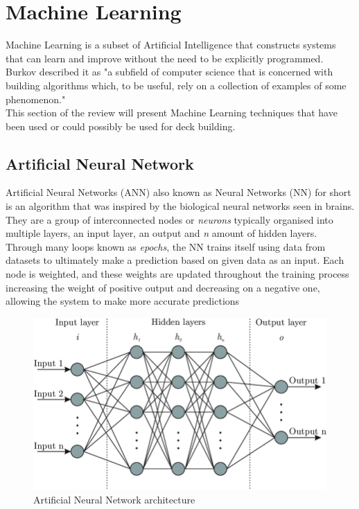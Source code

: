 \documentclass{report} %
\begin{document}
\section{Machine Learning}
Machine Learning is a subset of Artificial Intelligence that constructs systems that can learn and improve without the need to be explicitly programmed. Burkov described it as "a subﬁeld of computer science that is concerned with building algorithms which, to be useful, rely on a collection of examples of some phenomenon." \cite{burkov2019} \\
\indent This section of the review will present Machine Learning techniques that have been used or could possibly be used for deck building.
\subsection{Artificial Neural Network}
Artificial Neural Networks (ANN) also known as Neural Networks (NN) for short is an algorithm that was inspired by the biological neural networks seen in brains. They are a group of interconnected nodes or \textit{neurons} typically organised into multiple layers, an input layer, an output and \textit{n} amount of hidden layers. Through many loops known as \textit{epochs}, the NN trains itself using data from datasets to ultimately make a prediction based on given data as an input. Each node is weighted, and these weights are updated throughout the training process increasing the weight of positive output and decreasing on a negative one, allowing the system to make more accurate predictions \cite{3blue1brown}  \\
\begin{figure}[h]
\centering
\includegraphics[width=1\textwidth]{ANN}
\caption{Artificial Neural Network architecture \cite{Facundo2017}  }
\label{ea}
\end{figure}
\end{document}
